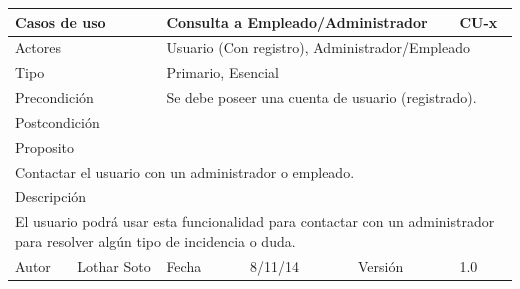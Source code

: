 \documentclass{article}
\begin{document}
\begin{table}[h]
\begin{tabular}{|l|l|l|l|l|l|}
\hline
\multicolumn{2}{|p{2cm}|}{Casos de uso}  & \multicolumn{3}{p{7cm}|}{\textbf{Consulta a Empleado/Administrador}} & CU-x \\
\hline
\multicolumn{2}{|p{2cm}|}{Actores}       & \multicolumn{4}{p{8cm}|}{Usuario (Con registro), Administrador/Empleado}        \\
\hline
\multicolumn{2}{|p{2cm}|}{Tipo}          & \multicolumn{4}{p{8cm}|}{Primario, Esencial}        \\
\hline
\multicolumn{2}{|p{2cm}|}{Precondición}  & \multicolumn{4}{p{8cm}|}{Se debe poseer una cuenta de usuario (registrado).}        \\
\hline
\multicolumn{2}{|p{2cm}|}{Postcondición} & \multicolumn{4}{p{8cm}|}{}        \\
\hline
\multicolumn{6}{|p{10cm}|}{Proposito}                                   \\
\hline
\multicolumn{6}{|p{10cm}|}{Contactar el usuario con un administrador o empleado.}                                            \\
\hline
\multicolumn{6}{|p{10cm}|}{Descripción}                                 \\
\hline
\multicolumn{6}{|p{10cm}|}{El usuario podrá usar esta funcionalidad para contactar con un administrador para resolver algún tipo de incidencia o duda.}                                            \\
\hline
Autor          &       Lothar Soto        & Fecha    &  8/11/14   &   Versión  & 1.0\\    
\hline
\end{tabular}
\end{table}
\end{document}
